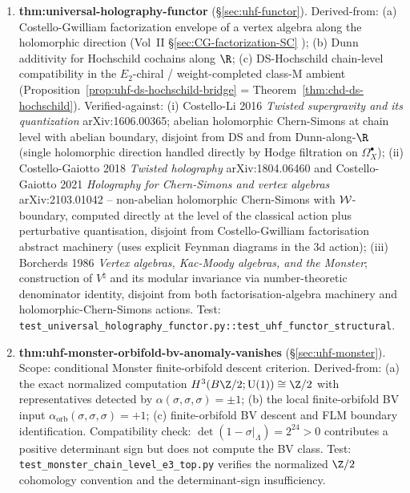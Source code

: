 \begin{enumerate}
\item \textbf{thm:universal-holography-functor}
 \textup{(}\S\ref{sec:uhf-functor}\textup{)}.
 Derived-from: \textup{(a)} Costello-Gwilliam factorization
 envelope of a vertex algebra along the holomorphic direction
 \textup{(}Vol~II \S\ref*{sec:CG-factorization-SC}%
 \textup{)}; \textup{(b)} Dunn additivity for Hochschild cochains
 along $\R$; \textup{(c)} DS-Hochschild chain-level compatibility in
 the $E_2$-chiral / weight-completed class-M ambient
 \textup{(}Proposition~\ref{prop:uhf-ds-hochschild-bridge} =
 Theorem~\ref*{thm:chd-ds-hochschild}\textup{)}.
 Verified-against: \textup{(i)} Costello-Li 2016 \emph{Twisted
 supergravity and its quantization} arXiv:1606.00365; abelian
 holomorphic Chern-Simons at chain level with abelian boundary,
 disjoint from DS and from Dunn-along-$\R$ \textup{(}single
 holomorphic direction handled directly by Hodge filtration on
 $\Omega^\bullet_X$\textup{)};
 \textup{(ii)} Costello-Gaiotto 2018 \emph{Twisted holography}
 arXiv:1804.06460 and Costello-Gaiotto 2021 \emph{Holography for
 Chern-Simons and vertex algebras} arXiv:2103.01042 --
 non-abelian holomorphic Chern-Simons with $\mathcal{W}$-boundary,
 computed directly at the level of the classical action plus
 perturbative quantisation, disjoint from Costello-Gwilliam
 factorisation abstract machinery \textup{(}uses explicit
 Feynman diagrams in the 3d action\textup{)};
 \textup{(iii)} Borcherds 1986 \emph{Vertex algebras, Kac-Moody
 algebras, and the Monster}; construction of $V^\natural$ and
 its modular invariance via number-theoretic denominator
 identity, disjoint from both factorisation-algebra machinery
 and holomorphic-Chern-Simons actions.
 Test: \texttt{test\_universal\_holography\_functor.py::test\_uhf\_functor\_structural}.

\item \textbf{thm:uhf-monster-orbifold-bv-anomaly-vanishes}
 \textup{(}\S\ref{sec:uhf-monster}\textup{)}.
 Scope: conditional Monster finite-orbifold descent criterion.
 Derived-from: \textup{(a)} the exact normalized computation
 $H^3(B\Z/2;\mathrm{U}(1))\cong\Z/2$ with representatives detected
 by $\alpha(\sigma,\sigma,\sigma)=\pm1$; \textup{(b)} the local
 finite-orbifold BV input
 $\alpha_{\mathrm{orb}}(\sigma,\sigma,\sigma)=+1$; \textup{(c)}
 finite-orbifold BV descent and FLM boundary identification.
 Compatibility check: $\det(1-\sigma|_\Lambda)=2^{24}>0$ contributes
 a positive determinant sign but does not compute the BV class.
 Test: \texttt{test\_monster\_chain\_level\_e3\_top.py} verifies the
 normalized $\Z/2$ cohomology convention and the determinant-sign
 insufficiency.


\end{enumerate}
